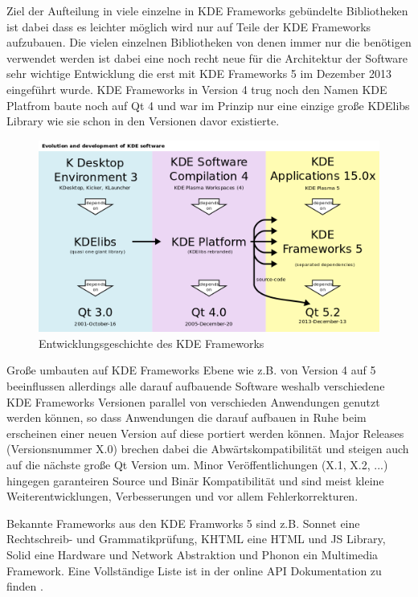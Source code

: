 \documentclass[10pt,a4paper,twocolumn]{article}
\begin{document}
Ziel der Aufteilung in viele einzelne in KDE Frameworks gebündelte Bibliotheken ist dabei dass es leichter möglich wird nur auf Teile der KDE Frameworks aufzubauen.
Die vielen einzelnen Bibliotheken von denen immer nur die benötigen verwendet werden ist dabei eine noch recht neue für die Architektur der Software sehr wichtige Entwicklung die erst mit KDE Frameworks 5 im Dezember 2013 eingeführt wurde. KDE Frameworks in Version 4 trug noch den Namen KDE Platfrom baute noch auf Qt 4 und war im Prinzip nur eine einzige große KDElibs Library wie sie schon in den Versionen davor existierte.
\begin{figure}[h]
\centering
\includegraphics[width=0.8\columnwidth]{images/Evolution_and_development_of_KDE_software}
\caption{Entwicklungsgeschichte des KDE Frameworks \cite{KDEFrameworkDevelopment}}
\label{fig:Evolution_and_development_of_KDE_software}
\end{figure}

Große umbauten auf KDE Frameworks Ebene wie z.B. von Version 4 auf 5 beeinflussen allerdings alle darauf aufbauende Software weshalb verschiedene KDE Frameworks Versionen parallel von verschieden Anwendungen genutzt werden können, so dass Anwendungen die darauf aufbauen in Ruhe beim erscheinen einer neuen Version auf diese portiert werden können. Major Releases (Versionsnummer X.0) brechen dabei die Abwärtskompatibilität und steigen auch auf die nächste große Qt Version um. Minor Veröffentlichungen (X.1, X.2, ...) hingegen garanteiren Source und Binär Kompatibilität und sind meist kleine Weiterentwicklungen, Verbesserungen und vor allem Fehlerkorrekturen.

Bekannte Frameworks aus den KDE Framworks 5 sind z.B. Sonnet eine Rechtschreib- und Grammatikprüfung, KHTML eine HTML und JS Library, Solid eine Hardware und Network Abstraktion und Phonon ein Multimedia Framework. Eine Vollständige Liste ist in der online API Dokumentation zu finden \cite{KDEDeveloperPlatform}.
\end{document}
